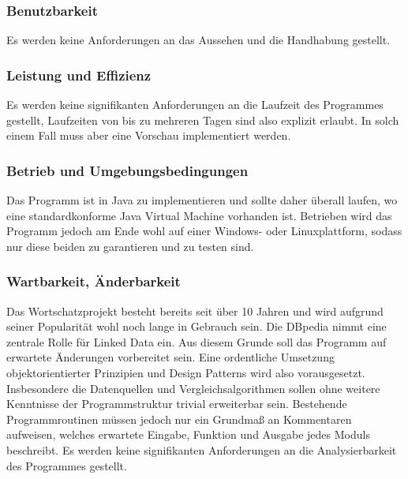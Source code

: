 \subsubsection{Benutzbarkeit}
Es werden keine Anforderungen an das Aussehen und die Handhabung gestellt.

\subsubsection{Leistung und Effizienz}
Es werden keine signifikanten Anforderungen an die Laufzeit des Programmes gestellt, Laufzeiten von bis zu mehreren Tagen sind also explizit erlaubt. In solch einem Fall muss aber eine Vorschau implementiert werden.

\subsubsection{Betrieb und Umgebungsbedingungen}
Das Programm ist in Java zu implementieren und sollte daher überall laufen, wo eine standardkonforme Java Virtual Machine vorhanden ist.
Betrieben wird das Programm jedoch am Ende wohl auf einer Windows- oder Linuxplattform, sodass nur diese beiden zu garantieren und zu testen sind.

\subsubsection{Wartbarkeit, Änderbarkeit}
Das Wortschatzprojekt besteht bereits seit über 10 Jahren und wird aufgrund seiner Popularität wohl noch lange in Gebrauch sein.
Die DBpedia nimmt eine zentrale Rolle für Linked Data ein.
Aus diesem Grunde soll das Programm auf erwartete Änderungen vorbereitet sein.
Eine ordentliche Umsetzung objektorientierter Prinzipien und Design Patterns wird also vorausgesetzt.
Insbesondere die Datenquellen und Vergleichsalgorithmen sollen ohne weitere Kenntnisse der Programmstruktur trivial erweiterbar sein.
Bestehende Programmroutinen müssen jedoch nur ein Grundmaß an Kommentaren aufweisen, welches erwartete Eingabe, Funktion und Ausgabe jedes Moduls beschreibt.
Es werden keine signifikanten Anforderungen an die Analysierbarkeit des Programmes gestellt.

